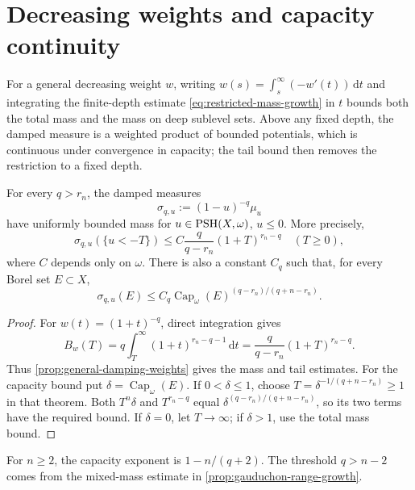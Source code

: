 \section{Decreasing weights and capacity continuity}

For a general decreasing weight $w$, writing $w(s)=\int_s^\infty(-w'(t))\,\mathrm{d}t$ and integrating the finite-depth estimate \eqref{eq:restricted-mass-growth} in $t$ bounds both the total mass and the mass on deep sublevel sets. Above any fixed depth, the damped measure is a weighted product of bounded potentials, which is continuous under convergence in capacity; the tail bound then removes the restriction to a fixed depth.



\begin{theorem}\label{thm:polynomial-damping}
For every $q>r_n$, the damped measures
\[
 \sigma_{q,u}:=(1-u)^{-q}\mu_u
\]
have uniformly bounded mass for $u\in\mathrm{PSH}(X,\omega)$, $u\leq0$. More precisely,
\[
 \sigma_{q,u}(\{u<-T\})
 \leq C\frac{q}{q-r_n}(1+T)^{r_n-q}\quad(T\geq0),
\]
where $C$ depends only on $\omega$. There is also a constant $C_q$ such that, for every Borel set $E\subset X$,
\[
 \sigma_{q,u}(E)\leq C_q\operatorname{Cap}_\omega(E)^{(q-r_n)/(q+n-r_n)}.
\]
\end{theorem}
\begin{proof}
For $w(t)=(1+t)^{-q}$, direct integration gives
\[
 B_w(T)=q\int_T^\infty(1+t)^{r_n-q-1}\,\mathrm{d}t
       =\frac{q}{q-r_n}(1+T)^{r_n-q}.
\]
Thus \cref{prop:general-damping-weights} gives the mass and tail estimates. For the capacity bound put $\delta=\operatorname{Cap}_\omega(E)$. If $0<\delta\leq1$, choose $T=\delta^{-1/(q+n-r_n)}\geq1$ in that theorem. Both $T^n\delta$ and $T^{r_n-q}$ equal $\delta^{(q-r_n)/(q+n-r_n)}$, so its two terms have the required bound. If $\delta=0$, let $T\to\infty$; if $\delta>1$, use the total mass bound.
\end{proof}

For $n\geq2$, the capacity exponent is $1-n/(q+2)$. The threshold $q>n-2$ comes from the mixed-mass estimate in \cref{prop:gauduchon-range-growth}.

